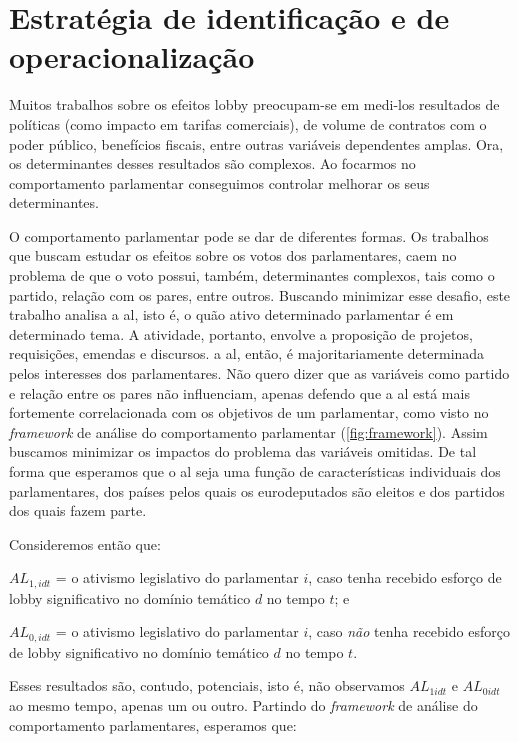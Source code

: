 \section{Estratégia de identificação e de operacionalização}

Muitos trabalhos sobre os efeitos lobby preocupam-se em medi-los resultados de políticas (como impacto em tarifas comerciais), de volume de contratos com o poder público, benefícios fiscais, entre outras variáveis dependentes amplas. Ora, os determinantes desses resultados são complexos. Ao focarmos no comportamento parlamentar conseguimos controlar melhorar os seus determinantes.

O comportamento parlamentar pode se dar de diferentes formas. Os trabalhos que buscam estudar os efeitos sobre os votos dos parlamentares, caem no problema de que o voto possui, também, determinantes complexos, tais como o partido, relação com os pares, entre outros. Buscando minimizar esse desafio, este trabalho analisa a \acrfull{al}, isto é, o quão ativo determinado parlamentar é em determinado tema. A atividade, portanto, envolve a proposição de projetos, requisições, emendas e discursos. a \acrshort{al}, então, é majoritariamente determinada pelos interesses dos parlamentares. Não quero dizer que as variáveis como partido e relação entre os pares não influenciam, apenas defendo que a \acrshort{al} está mais fortemente correlacionada com os objetivos de um parlamentar, como visto no \textit{framework} de análise do comportamento parlamentar (\ref{fig:framework}). Assim buscamos minimizar os impactos do problema das variáveis omitidas. De tal forma que esperamos que o \acrshort{al} seja uma função de características individuais dos parlamentares, dos países pelos quais os eurodeputados são eleitos e dos partidos dos quais fazem parte. 

Consideremos então que:
\begin{center}
$AL_{1,idt}$ = o ativismo legislativo do parlamentar $i$, caso tenha recebido esforço de lobby significativo no domínio temático $d$ no tempo $t$; e

$AL_{0,idt}$ = o ativismo legislativo do parlamentar $i$, caso \emph{não} tenha recebido esforço de lobby significativo no domínio temático $d$ no tempo $t$.
\end{center}

Esses resultados são, contudo, potenciais, isto é, não observamos $AL_{1idt}$ e $AL_{0idt}$ ao mesmo tempo, apenas um ou outro. Partindo do \textit{framework} de análise do comportamento parlamentares, esperamos que:

